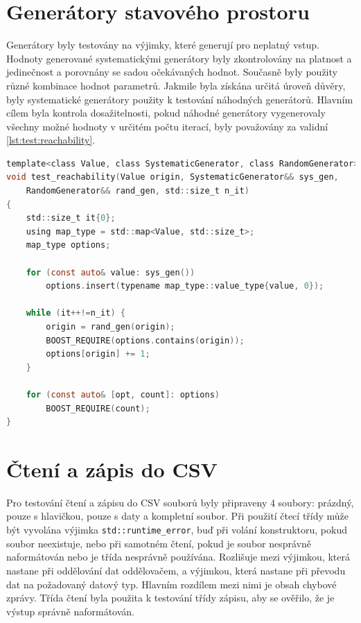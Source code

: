 \section{Generátory stavového prostoru}
Generátory byly testovány na výjimky, které generují pro neplatný vstup.
Hodnoty generované systematickými generátory byly zkontrolovány na platnost a jedinečnost a porovnány se sadou očekávaných hodnot.
Současně byly použity různé kombinace hodnot parametrů.
Jakmile byla získána určitá úroveň důvěry, byly systematické generátory použity k testování náhodných generátorů.
Hlavním cílem byla kontrola dosažitelnosti, pokud náhodné generátory vygenerovaly všechny možné hodnoty v určitém počtu iterací, byly považovány za validní \ref{lst:test:reachability}.

\begin{lstlisting}[caption={~Testování dosažitelnosti stavů},label={lst:test:reachability},captionpos=t,abovecaptionskip=-\medskipamount,belowcaptionskip=\medskipamount,language=C]
template<class Value, class SystematicGenerator, class RandomGenerator>
void test_reachability(Value origin, SystematicGenerator&& sys_gen,
    RandomGenerator&& rand_gen, std::size_t n_it)
{
    std::size_t it{0};
    using map_type = std::map<Value, std::size_t>;
    map_type options;

    for (const auto& value: sys_gen())
        options.insert(typename map_type::value_type{value, 0});

    while (it++!=n_it) {
        origin = rand_gen(origin);
        BOOST_REQUIRE(options.contains(origin));
        options[origin] += 1;
    }

    for (const auto& [opt, count]: options)
        BOOST_REQUIRE(count);
}
\end{lstlisting}

\section{Čtení a zápis do CSV}
Pro testování čtení a zápisu do CSV souborů byly připraveny 4 soubory: prázdný, pouze s hlavičkou, pouze s daty a kompletní soubor.
Při použití čtecí třídy může být vyvolána výjimka \texttt{std::runtime\_error}, buď při volání konstruktoru, pokud soubor neexistuje, nebo při samotném čtení, pokud je soubor nesprávně naformátován nebo je třída nesprávně používána.
Rozlišuje mezi výjimkou, která nastane při oddělování dat oddělovačem, a výjimkou, která nastane při převodu dat na požadovaný datový typ.
Hlavním rozdílem mezi nimi je obsah chybové zprávy.
Třída čtení byla použita k testování třídy zápisu, aby se ověřilo, že je výstup správně naformátován.

